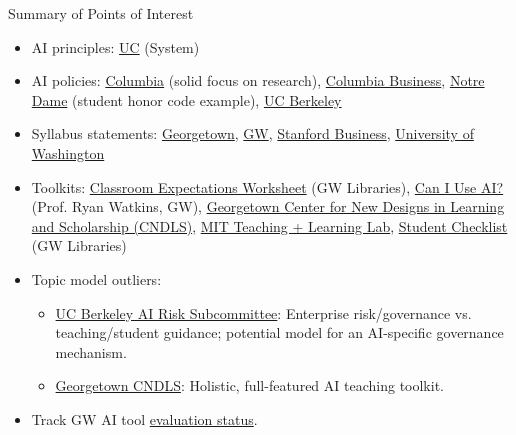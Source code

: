 \documentclass[aspectratio=169]{beamer}
\begin{document}
\begin{frame}{Summary of Points of Interest}

    \small

    \begin{itemize}
    \item AI principles: \href{https://ai.universityofcalifornia.edu/governance-transparency/}{UC} (System)
    \item AI policies: \href{https://provost.columbia.edu/content/office-senior-vice-provost/ai-policy}{Columbia} (solid focus on research), \href{https://students.business.columbia.edu/office-of-student-affairs/academic-advising-and-student-success/academic-integrity/generative-ai-policy}{Columbia Business}, \href{https://honorcode.nd.edu/generative-ai-policy-for-students-august-2023/}{Notre Dame} (student honor code example), \href{https://oercs.berkeley.edu/appropriate-use-generative-ai-tools}{UC Berkeley}
    \item Syllabus statements: \href{https://cndls.georgetown.edu/resources/syllabus-policies/ai-and-homework-support/}{Georgetown}, \href{https://provost.gwu.edu/sites/g/files/zaxdzs5926/files/2023-04/generative-artificial-intelligence-guidelines-april-2023.pdf}{GW}, \href{https://tlhub.stanford.edu/docs/course-policies-on-generative-ai-use/}{Stanford Business}, \href{https://teaching.washington.edu/course-design/ai/sample-ai-syllabus-statements/}{University of Washington}
    \item Toolkits: \href{https://docs.google.com/document/d/1hQwgSR1Caksy7Rb2LRBhLEBugDLTsuMJVLTFLgDXxu8/edit?tab=t.0}{Classroom Expectations Worksheet} (GW Libraries), \href{https://sites.google.com/view/aiassignments}{Can I Use AI?} (Prof. Ryan Watkins, GW), \href{https://cndls.georgetown.edu/resources/ai/}{Georgetown Center for New Designs in Learning and Scholarship (CNDLS)}, \href{https://tll.mit.edu/teaching-resources/course-design/gen-ai-your-course/}{MIT Teaching + Learning Lab}, \href{https://docs.google.com/document/d/1Nutviqrix6NMb1XLM2N5nLe2Q1_7JHu5aTXlnSxKCh0/edit?tab=t.0}{Student Checklist} (GW Libraries)
    \item Topic model outliers:
    \begin{itemize}
        \item \href{https://oercs.berkeley.edu/CERC-AIR}{UC Berkeley AI Risk Subcommittee}: Enterprise risk/governance vs. teaching/student guidance; potential model for an AI-specific governance mechanism.
        \item \href{https://cndls.georgetown.edu/resources/ai/}{Georgetown CNDLS}: Holistic, full-featured AI teaching toolkit.
    \end{itemize}
    \item Track GW AI tool \href{https://it.gwu.edu/ai-tools-status}{evaluation status}.
    \end{itemize}
    
\end{frame}
\end{document}
